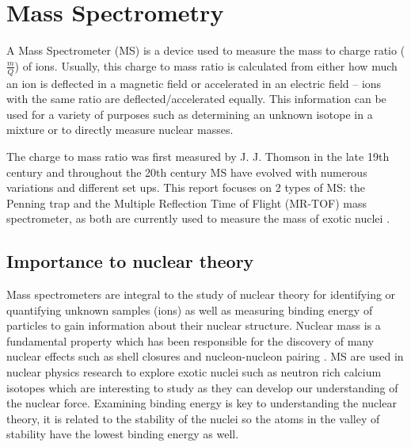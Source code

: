 \section{Mass Spectrometry}
A Mass Spectrometer (MS) is a device used to measure the mass to charge ratio ($\frac{m}{Q}$) of ions.
Usually, this charge to mass ratio is calculated from either how much an ion is deflected in a magnetic field or accelerated in an electric field – ions with the same ratio are deflected/accelerated equally.
This information can be used for a variety of purposes such as determining an unknown isotope in a mixture or to directly measure nuclear masses.

The charge to mass ratio was first measured by J. J. Thomson in the late 19th century \cite{noauthor_j_nodate} and throughout the 20th century MS have evolved with numerous variations and different set ups.
This report focuses on 2 types of MS: the Penning trap and the Multiple Reflection Time of Flight (MR-TOF) mass spectrometer, as both are currently used to measure the mass of exotic nuclei \cite{famiano_nuclear_2019}.

\subsection{Importance to nuclear theory}
Mass spectrometers are integral to the study of nuclear theory for identifying or quantifying unknown samples (ions) as well as measuring binding energy of particles to gain information about their nuclear structure.
Nuclear mass is a fundamental property which has been responsible for the discovery of many nuclear effects such as shell closures and nucleon-nucleon pairing \cite{blaum_precision_2012}.
MS are used in nuclear physics research to explore exotic nuclei such as neutron rich calcium isotopes \cite{wienholtz_masses_2013} which are interesting to study as they can develop our understanding of the nuclear force.
Examining binding energy is key to understanding the nuclear theory, it is related to the stability of the nuclei so the atoms in the valley of stability have the lowest binding energy as well.

